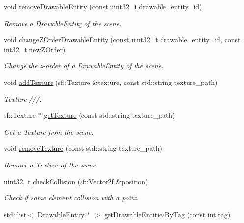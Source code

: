 \begin{DoxyCompactItemize}
void \hyperlink{class_scene_ade7d7ad9e17a99a035f0a8ecb5495cd4}{remove\+Drawable\+Entity} (const uint32\+\_\+t drawable\+\_\+entity\+\_\+id)
\begin{DoxyCompactList}\small\item\em Remove a \hyperlink{class_drawable_entity}{Drawable\+Entity} of the scene. \end{DoxyCompactList}\item 
void \hyperlink{class_scene_abf79f183e4780f8c256238abb9f8a1b0}{change\+Z\+Order\+Drawable\+Entity} (const uint32\+\_\+t drawable\+\_\+entity\+\_\+id, const int32\+\_\+t new\+Z\+Order)
\begin{DoxyCompactList}\small\item\em Change the z-\/order of a \hyperlink{class_drawable_entity}{Drawable\+Entity} of the scene. \end{DoxyCompactList}\item 
void \hyperlink{class_scene_ad7c686656e9ad8e20f85f7997c4bc747}{add\+Texture} (sf\+::\+Texture \&texture, const std\+::string texture\+\_\+path)
\begin{DoxyCompactList}\small\item\em Texture ///. \end{DoxyCompactList}\item 
sf\+::\+Texture $\ast$ \hyperlink{class_scene_a1c7233bcc955b7b71156b31205ec2360}{get\+Texture} (const std\+::string texture\+\_\+path)
\begin{DoxyCompactList}\small\item\em Get a Texture from the scene. \end{DoxyCompactList}\item 
void \hyperlink{class_scene_a6418fa4353c7d079b42e11af7343c8a9}{remove\+Texture} (const std\+::string texture\+\_\+path)
\begin{DoxyCompactList}\small\item\em Remove a Texture of the scene. \end{DoxyCompactList}\item 
uint32\+\_\+t \hyperlink{class_scene_ab4e853e94e486af7dcd0d74434453a8e}{check\+Collision} (sf\+::\+Vector2f \&position)
\begin{DoxyCompactList}\small\item\em Check if some element collision with a point. \end{DoxyCompactList}\item 
std\+::list$<$ \hyperlink{class_drawable_entity}{Drawable\+Entity} $\ast$ $>$ \hyperlink{class_scene_a589e481e1ee58d356f1424a20f9decff}{get\+Drawable\+Entities\+By\+Tag} (const int tag)

\end{DoxyCompactItemize}
